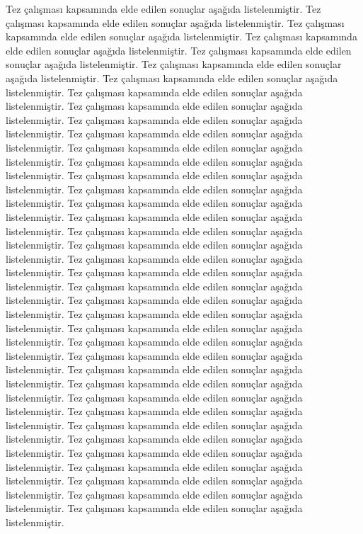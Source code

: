 Tez çalışması kapsamında elde edilen sonuçlar aşağıda listelenmiştir.
Tez çalışması kapsamında elde edilen sonuçlar aşağıda listelenmiştir.
Tez çalışması kapsamında elde edilen sonuçlar aşağıda listelenmiştir.
Tez çalışması kapsamında elde edilen sonuçlar aşağıda listelenmiştir.
Tez çalışması kapsamında elde edilen sonuçlar aşağıda listelenmiştir.
Tez çalışması kapsamında elde edilen sonuçlar aşağıda listelenmiştir.
Tez çalışması kapsamında elde edilen sonuçlar aşağıda listelenmiştir.
Tez çalışması kapsamında elde edilen sonuçlar aşağıda listelenmiştir.
Tez çalışması kapsamında elde edilen sonuçlar aşağıda listelenmiştir.
Tez çalışması kapsamında elde edilen sonuçlar aşağıda listelenmiştir.
Tez çalışması kapsamında elde edilen sonuçlar aşağıda listelenmiştir.
Tez çalışması kapsamında elde edilen sonuçlar aşağıda listelenmiştir.
Tez çalışması kapsamında elde edilen sonuçlar aşağıda listelenmiştir.
Tez çalışması kapsamında elde edilen sonuçlar aşağıda listelenmiştir.
Tez çalışması kapsamında elde edilen sonuçlar aşağıda listelenmiştir.
Tez çalışması kapsamında elde edilen sonuçlar aşağıda listelenmiştir.
Tez çalışması kapsamında elde edilen sonuçlar aşağıda listelenmiştir.
Tez çalışması kapsamında elde edilen sonuçlar aşağıda listelenmiştir.
Tez çalışması kapsamında elde edilen sonuçlar aşağıda listelenmiştir.
Tez çalışması kapsamında elde edilen sonuçlar aşağıda listelenmiştir.
Tez çalışması kapsamında elde edilen sonuçlar aşağıda listelenmiştir.
Tez çalışması kapsamında elde edilen sonuçlar aşağıda listelenmiştir.
Tez çalışması kapsamında elde edilen sonuçlar aşağıda listelenmiştir.
Tez çalışması kapsamında elde edilen sonuçlar aşağıda listelenmiştir.
Tez çalışması kapsamında elde edilen sonuçlar aşağıda listelenmiştir.
Tez çalışması kapsamında elde edilen sonuçlar aşağıda listelenmiştir.
Tez çalışması kapsamında elde edilen sonuçlar aşağıda listelenmiştir.
Tez çalışması kapsamında elde edilen sonuçlar aşağıda listelenmiştir.
Tez çalışması kapsamında elde edilen sonuçlar aşağıda listelenmiştir.
Tez çalışması kapsamında elde edilen sonuçlar aşağıda listelenmiştir.
Tez çalışması kapsamında elde edilen sonuçlar aşağıda listelenmiştir.
Tez çalışması kapsamında elde edilen sonuçlar aşağıda listelenmiştir.
Tez çalışması kapsamında elde edilen sonuçlar aşağıda listelenmiştir.
Tez çalışması kapsamında elde edilen sonuçlar aşağıda listelenmiştir.
Tez çalışması kapsamında elde edilen sonuçlar aşağıda listelenmiştir.
Tez çalışması kapsamında elde edilen sonuçlar aşağıda listelenmiştir.
Tez çalışması kapsamında elde edilen sonuçlar aşağıda listelenmiştir.
Tez çalışması kapsamında elde edilen sonuçlar aşağıda listelenmiştir.
